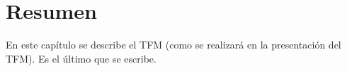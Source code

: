 \chapter*{Resumen}

En este capítulo se describe el TFM (como se realizará en la
presentación del TFM). Es el último que se escribe.

